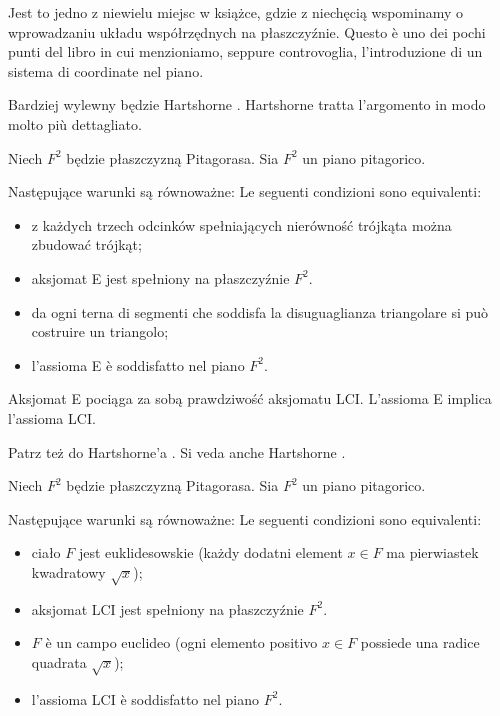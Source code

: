 Jest to jedno z niewielu miejsc w książce, gdzie z niechęcią wspominamy o wprowadzaniu układu współrzędnych na płaszczyźnie. %
Questo è uno dei pochi punti del libro in cui menzioniamo, seppure controvoglia, l'introduzione di un sistema di coordinate nel piano. %

Bardziej wylewny będzie Hartshorne \cite[s. 186--194]{hartshorne_2000}. %
Hartshorne \cite[pp.~186--194]{hartshorne_2000} tratta l'argomento in modo molto più dettagliato. %

\begin{proposition}
    Niech $F^2$ będzie płaszczyzną Pitagorasa. %
    Sia $F^2$ un piano pitagorico. %

    Następujące warunki są równoważne: %
    Le seguenti condizioni sono equivalenti: %
    \begin{itemize}
        \item z każdych trzech odcinków spełniających nierówność trójkąta można zbudować trójkąt; %
        \item aksjomat E jest spełniony na płaszczyźnie $F^2$. %
        \item da ogni terna di segmenti che soddisfa la disuguaglianza triangolare si può costruire un triangolo; %
        \item l'assioma E è soddisfatto nel piano $F^2$. %
    \end{itemize}
\end{proposition}

Aksjomat E pociąga za sobą prawdziwość aksjomatu LCI. %
L'assioma E implica l'assioma LCI. %

Patrz też do Hartshorne'a \cite[s. 144]{hartshorne_2000}. %
Si veda anche Hartshorne \cite[p.~144]{hartshorne_2000}. %

\begin{proposition}
    Niech $F^2$ będzie płaszczyzną Pitagorasa. %
    Sia $F^2$ un piano pitagorico. %

    Następujące warunki są równoważne: %
    Le seguenti condizioni sono equivalenti: %
    \begin{itemize}
        \item ciało $F$ jest euklidesowskie (każdy dodatni element $x \in F$ ma pierwiastek kwadratowy $\sqrt{x}$); %
        \item aksjomat LCI jest spełniony na płaszczyźnie $F^2$. %
        \item $F$ è un campo euclideo (ogni elemento positivo $x\in F$ possiede una radice quadrata $\sqrt{x}$); %
        \item l'assioma LCI è soddisfatto nel piano $F^2$. %
    \end{itemize}
\end{proposition}

